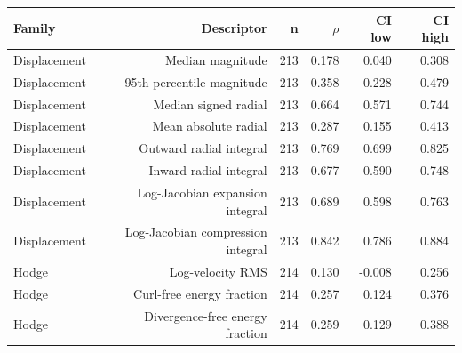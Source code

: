 \begin{tabular}{lrrrrr}
\toprule
Family & Descriptor & n & $\rho$ & CI low & CI high \\
\midrule
Displacement & Median magnitude & 213 & 0.178 & 0.040 & 0.308 \\
Displacement & 95th-percentile magnitude & 213 & 0.358 & 0.228 & 0.479 \\
Displacement & Median signed radial & 213 & 0.664 & 0.571 & 0.744 \\
Displacement & Mean absolute radial & 213 & 0.287 & 0.155 & 0.413 \\
Displacement & Outward radial integral & 213 & 0.769 & 0.699 & 0.825 \\
Displacement & Inward radial integral & 213 & 0.677 & 0.590 & 0.748 \\
Displacement & Log-Jacobian expansion integral & 213 & 0.689 & 0.598 & 0.763 \\
Displacement & Log-Jacobian compression integral & 213 & 0.842 & 0.786 & 0.884 \\
Hodge & Log-velocity RMS & 214 & 0.130 & -0.008 & 0.256 \\
Hodge & Curl-free energy fraction & 214 & 0.257 & 0.124 & 0.376 \\
Hodge & Divergence-free energy fraction & 214 & 0.259 & 0.129 & 0.388 \\
\bottomrule
\end{tabular}
